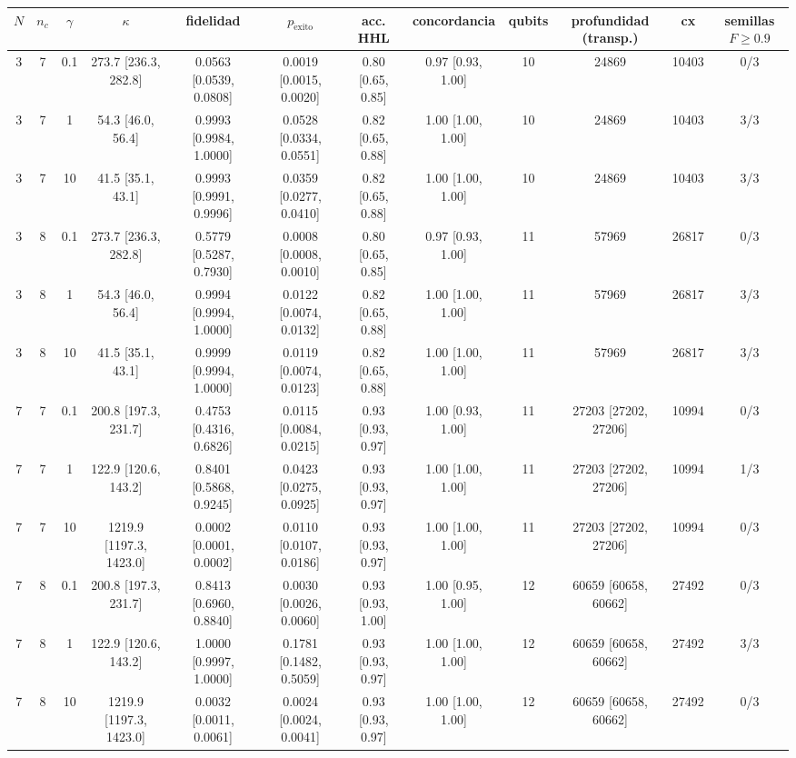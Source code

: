 \begin{tabular}{cccccccccccc}
\hline
$N$ & $n_c$ & $\gamma$ & $\kappa$ & fidelidad & $p_{\mathrm{\acute{e}xito}}$ & acc. HHL & concordancia & qubits & profundidad (transp.) & cx & semillas $F\geq0.9$ \\
\hline
3 & 7 & 0.1 & 273.7 [236.3, 282.8] & 0.0563 [0.0539, 0.0808] & 0.0019 [0.0015, 0.0020] & 0.80 [0.65, 0.85] & 0.97 [0.93, 1.00] & 10 & 24869 & 10403 & 0/3 \\
3 & 7 & 1 & 54.3 [46.0, 56.4] & 0.9993 [0.9984, 1.0000] & 0.0528 [0.0334, 0.0551] & 0.82 [0.65, 0.88] & 1.00 [1.00, 1.00] & 10 & 24869 & 10403 & 3/3 \\
3 & 7 & 10 & 41.5 [35.1, 43.1] & 0.9993 [0.9991, 0.9996] & 0.0359 [0.0277, 0.0410] & 0.82 [0.65, 0.88] & 1.00 [1.00, 1.00] & 10 & 24869 & 10403 & 3/3 \\
3 & 8 & 0.1 & 273.7 [236.3, 282.8] & 0.5779 [0.5287, 0.7930] & 0.0008 [0.0008, 0.0010] & 0.80 [0.65, 0.85] & 0.97 [0.93, 1.00] & 11 & 57969 & 26817 & 0/3 \\
3 & 8 & 1 & 54.3 [46.0, 56.4] & 0.9994 [0.9994, 1.0000] & 0.0122 [0.0074, 0.0132] & 0.82 [0.65, 0.88] & 1.00 [1.00, 1.00] & 11 & 57969 & 26817 & 3/3 \\
3 & 8 & 10 & 41.5 [35.1, 43.1] & 0.9999 [0.9994, 1.0000] & 0.0119 [0.0074, 0.0123] & 0.82 [0.65, 0.88] & 1.00 [1.00, 1.00] & 11 & 57969 & 26817 & 3/3 \\
7 & 7 & 0.1 & 200.8 [197.3, 231.7] & 0.4753 [0.4316, 0.6826] & 0.0115 [0.0084, 0.0215] & 0.93 [0.93, 0.97] & 1.00 [0.93, 1.00] & 11 & 27203 [27202, 27206] & 10994 & 0/3 \\
7 & 7 & 1 & 122.9 [120.6, 143.2] & 0.8401 [0.5868, 0.9245] & 0.0423 [0.0275, 0.0925] & 0.93 [0.93, 0.97] & 1.00 [1.00, 1.00] & 11 & 27203 [27202, 27206] & 10994 & 1/3 \\
7 & 7 & 10 & 1219.9 [1197.3, 1423.0] & 0.0002 [0.0001, 0.0002] & 0.0110 [0.0107, 0.0186] & 0.93 [0.93, 0.97] & 1.00 [1.00, 1.00] & 11 & 27203 [27202, 27206] & 10994 & 0/3 \\
7 & 8 & 0.1 & 200.8 [197.3, 231.7] & 0.8413 [0.6960, 0.8840] & 0.0030 [0.0026, 0.0060] & 0.93 [0.93, 1.00] & 1.00 [0.95, 1.00] & 12 & 60659 [60658, 60662] & 27492 & 0/3 \\
7 & 8 & 1 & 122.9 [120.6, 143.2] & 1.0000 [0.9997, 1.0000] & 0.1781 [0.1482, 0.5059] & 0.93 [0.93, 0.97] & 1.00 [1.00, 1.00] & 12 & 60659 [60658, 60662] & 27492 & 3/3 \\
7 & 8 & 10 & 1219.9 [1197.3, 1423.0] & 0.0032 [0.0011, 0.0061] & 0.0024 [0.0024, 0.0041] & 0.93 [0.93, 0.97] & 1.00 [1.00, 1.00] & 12 & 60659 [60658, 60662] & 27492 & 0/3 \\
\hline
\end{tabular}
